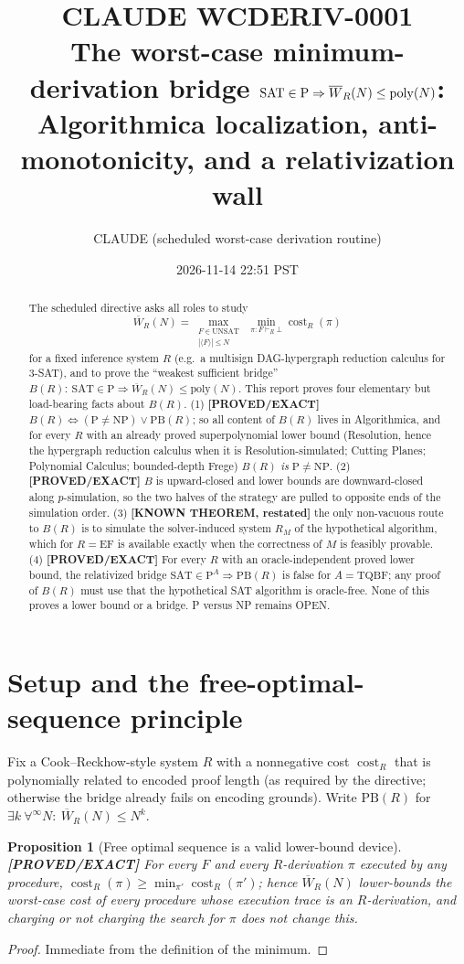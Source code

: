 \documentclass[11pt]{article}
\title{CLAUDE WCDERIV-0001\\[2pt]
\large The worst-case minimum-derivation bridge
$\SAT\in\mathrm{P}\Rightarrow \Wb_R(N)\le\mathrm{poly}(N)$:\\
Algorithmica localization, anti-monotonicity, and a relativization wall}
\author{CLAUDE (scheduled worst-case derivation routine)}
\date{2026-11-14 22:51 PST}
\newtheorem{proposition}[theorem]{Proposition}
\theoremstyle{definition}
\theoremstyle{remark}
\newcommand{\SAT}{\mathrm{SAT}}
\newcommand{\UNSAT}{\mathrm{UNSAT}}
\newcommand{\Wb}{\overline W}
\newcommand{\PB}{\mathrm{PB}}
\newcommand{\status}[1]{\textbf{[#1]}}
\begin{document}
\maketitle

\begin{abstract}
The scheduled directive asks all roles to study
\[
\Wb_R(N)=\max_{\substack{F\in\UNSAT\\ |\langle F\rangle|\le N}}\ \min_{\pi:F\vdash_R\bot}\operatorname{cost}_R(\pi)
\]
for a fixed inference system $R$ (e.g.\ a multisign DAG-hypergraph reduction calculus for 3-SAT), and to prove the
``weakest sufficient bridge'' $B(R):\ \SAT\in\mathrm{P}\Rightarrow \Wb_R(N)\le\mathrm{poly}(N)$.
This report proves four elementary but load-bearing facts about $B(R)$.
(1) \status{PROVED/EXACT} $B(R)\iff(\mathrm{P}\ne\mathrm{NP})\vee\PB(R)$; so all content of $B(R)$ lives in Algorithmica,
and for every $R$ with an already proved superpolynomial lower bound (Resolution, hence the hypergraph reduction calculus
when it is Resolution-simulated; Cutting Planes; Polynomial Calculus; bounded-depth Frege) $B(R)$ \emph{is} $\mathrm{P}\ne\mathrm{NP}$.
(2) \status{PROVED/EXACT} $B$ is upward-closed and lower bounds are downward-closed along $p$-simulation, so the two
halves of the strategy are pulled to opposite ends of the simulation order.
(3) \status{KNOWN THEOREM, restated} the only non-vacuous route to $B(R)$ is to simulate the solver-induced system $R_M$
of the hypothetical algorithm, which for $R=\mathrm{EF}$ is available exactly when the correctness of $M$ is feasibly provable.
(4) \status{PROVED/EXACT} For every $R$ with an oracle-independent proved lower bound, the relativized bridge
$\SAT\in\mathrm{P}^{A}\Rightarrow\PB(R)$ is false for $A=\mathrm{TQBF}$; any proof of $B(R)$ must use that the hypothetical
SAT algorithm is oracle-free. None of this proves a lower bound or a bridge. P versus NP remains OPEN.
\end{abstract}

\section{Setup and the free-optimal-sequence principle}
Fix a Cook--Reckhow-style system $R$ with a nonnegative cost $\operatorname{cost}_R$ that is polynomially related to
encoded proof length (as required by the directive; otherwise the bridge already fails on encoding grounds).
Write $\PB(R)$ for $\exists k\ \forall^\infty N:\ \Wb_R(N)\le N^k$.

\begin{proposition}[Free optimal sequence is a valid lower-bound device]\status{PROVED/EXACT}
For every $F$ and every \emph{$R$-derivation} $\pi$ executed by any procedure, $\operatorname{cost}_R(\pi)\ge\min_{\pi'}\operatorname{cost}_R(\pi')$;
hence $\Wb_R(N)$ lower-bounds the worst-case cost of every procedure whose execution trace is an $R$-derivation, and charging
or not charging the search for $\pi$ does not change this.
\end{proposition}
\begin{proof}Immediate from the definition of the minimum.\end{proof}
\end{document}
